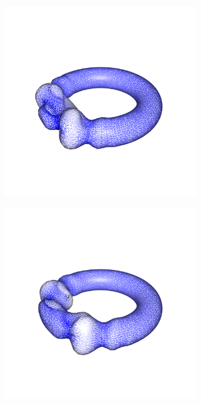 \documentclass[crop=false]{standalone}
\begin{document}
\begin{figure}[h]
      \begin{subfigure}[b]{0.24\textwidth}
        \center
        \includegraphics[trim={0.2cm 3.9cm 3.15cm 5.8cm},clip,width=0.95\textwidth]{images/torus_wave_4.png}
        \caption{}
      \end{subfigure}
      \begin{subfigure}[b]{0.24\textwidth}
        \center
        \includegraphics[trim={0.2cm 3.9cm 3.15cm 5.8cm},clip,width=0.95\textwidth]{images/torus_wave_5.png}

\end{subfigure}
\end{figure}
\end{document}

